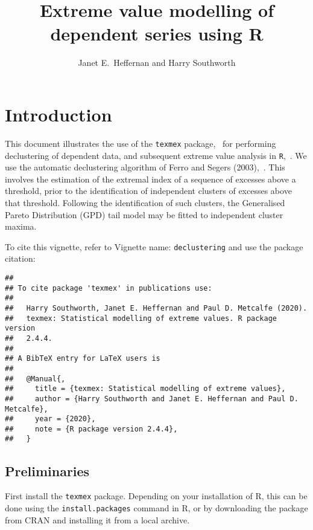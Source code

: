 \documentclass[10pt]{article}\usepackage[]{graphicx}\usepackage[]{color}
\makeatletter
\newenvironment{kframe}{%
 \def\at@end@of@kframe{}%
 \ifinner\ifhmode%
  \def\at@end@of@kframe{\end{minipage}}%
  \begin{minipage}{\columnwidth}%
 \fi\fi%
 \def\FrameCommand##1{\hskip\@totalleftmargin \hskip-\fboxsep
 \colorbox{shadecolor}{##1}\hskip-\fboxsep
     \hskip-\linewidth \hskip-\@totalleftmargin \hskip\columnwidth}%
 \MakeFramed {\advance\hsize-\width
   \@totalleftmargin\z@ \linewidth\hsize
   \@setminipage}}%
 {\par\unskip\endMakeFramed%
 \at@end@of@kframe}
\newenvironment{knitrout}{}{} %
\makeatother
\begin{document}
\title{Extreme value modelling of dependent series using R}
\author{Janet E.\ Heffernan and Harry Southworth}
\maketitle

%
\section{Introduction}
%
This document illustrates the use of the {\tt texmex} package,~\cite{texmex}
for performing declustering of dependent data, and subsequent extreme value analysis in {\tt R},~\cite{R}. We use the automatic declustering algorithm of Ferro and Segers (2003),~\cite{FerroSegers2003}.  This involves the estimation of the extremal index of a sequence of excesses above a threshold, prior to the identification of independent clusters of excesses above that threshold.  Following the identification of such clusters, the Generalised Pareto Distribution (GPD) tail model may be fitted to independent cluster maxima.

To cite this vignette, refer to Vignette name: {\tt declustering} and use the package citation:
\begin{knitrout}
\color{fgcolor}\begin{kframe}
\begin{verbatim}
## 
## To cite package 'texmex' in publications use:
## 
##   Harry Southworth, Janet E. Heffernan and Paul D. Metcalfe (2020).
##   texmex: Statistical modelling of extreme values. R package version
##   2.4.4.
## 
## A BibTeX entry for LaTeX users is
## 
##   @Manual{,
##     title = {texmex: Statistical modelling of extreme values},
##     author = {Harry Southworth and Janet E. Heffernan and Paul D. Metcalfe},
##     year = {2020},
##     note = {R package version 2.4.4},
##   }
\end{verbatim}
\end{kframe}
\end{knitrout}

%
\subsection{Preliminaries}
%
First install the
{\tt texmex} package. Depending on your installation of
R, this can be done using the {\tt install.packages}
command in R, or by downloading the package from CRAN and
installing it from a local archive.
\end{document}
